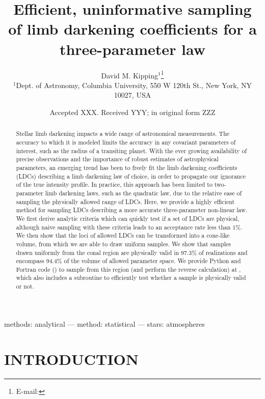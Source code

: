 \documentclass[a4paper,fleqn,usenatbib]{mnras}
\title[
Efficient, uninformative sampling of LDCs
]{
Efficient, uninformative sampling of limb darkening coefficients for a 
three-parameter law
}
\author[D. M. Kipping]{
David M. Kipping$^{1}$\thanks{E-mail:\href{mailto:\myemail}{\myemail}}
\\
$^{1}$Dept. of Astronomy, Columbia University, 550 W 120th St., New York, 
NY 10027, USA
}
\date{Accepted XXX. Received YYY; in original form ZZZ}
\begin{document}
\label{firstpage}
\pagerange{\pageref{firstpage}--\pageref{lastpage}}
\maketitle

\begin{abstract}
Stellar limb darkening impacts a wide range of astronomical measurements. The
accuracy to which it is modeled limits the accuracy in any covariant parameters 
of interest, such as the radius of a transiting planet. With the ever growing 
availability of precise observations and the importance of robust estimates of 
astrophysical parameters, an emerging trend has been to freely fit the limb 
darkening coefficients (LDCs) describing a limb darkening law of choice, in
order to propagate our ignorance of the true intensity profile. In practice,
this approach has been limited to two-parameter limb darkening laws, such as the
quadratic law, due to the relative ease of sampling the physically allowed
range of LDCs. Here, we provide a highly efficient method for sampling LDCs
describing a more accurate three-parameter non-linear law. We first derive 
analytic criteria which can quickly test if a set of LDCs are physical, although 
naive sampling with these criteria leads to an acceptance rate less than 1\%. We 
then show that the loci of allowed LDCs can be transformed into a cone-like 
volume, from which we are able to draw uniform samples. We show that samples 
drawn uniformly from the conal region are physically valid in 97.3\% of 
realizations and encompass 94.4\% of the volume of allowed parameter space. We 
provide Python and Fortran code (\LDC) to sample from this region (and perform 
the reverse calculation) at \link, which also includes a subroutine to 
efficiently test whether a sample is physically valid or not.
\end{abstract}

\begin{keywords}
methods: analytical --- method: statistical --- stars: atmospheres
\end{keywords}



\section{INTRODUCTION}
\label{sec:intro}
\end{document}
